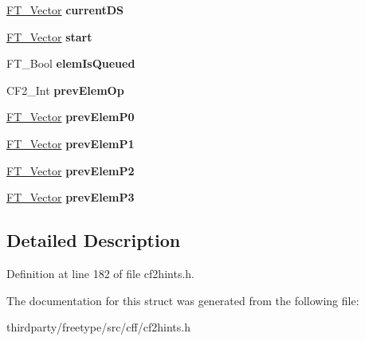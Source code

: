 \begin{DoxyCompactItemize}
\hyperlink{struct_f_t___vector__}{F\+T\+\_\+\+Vector} {\bfseries current\+DS}
\item 
\mbox{\label{struct_c_f2___glyph_path_rec___a9a9f0572cc1f6800b8861e0649f62c09}} 
\hyperlink{struct_f_t___vector__}{F\+T\+\_\+\+Vector} {\bfseries start}
\item 
\mbox{\label{struct_c_f2___glyph_path_rec___ad43b37ad4173fc8131c5863341b4d6c5}} 
F\+T\+\_\+\+Bool {\bfseries elem\+Is\+Queued}
\item 
\mbox{\label{struct_c_f2___glyph_path_rec___a6cd9752b2cee810496777e616506f74c}} 
C\+F2\+\_\+\+Int {\bfseries prev\+Elem\+Op}
\item 
\mbox{\label{struct_c_f2___glyph_path_rec___ad3886cc07890c61ca370da7902fb2c36}} 
\hyperlink{struct_f_t___vector__}{F\+T\+\_\+\+Vector} {\bfseries prev\+Elem\+P0}
\item 
\mbox{\label{struct_c_f2___glyph_path_rec___a020b66000c0d5cec70db4d38911f0b2e}} 
\hyperlink{struct_f_t___vector__}{F\+T\+\_\+\+Vector} {\bfseries prev\+Elem\+P1}
\item 
\mbox{\label{struct_c_f2___glyph_path_rec___a9a6df03953ebe1e8a977b8c17619eadb}} 
\hyperlink{struct_f_t___vector__}{F\+T\+\_\+\+Vector} {\bfseries prev\+Elem\+P2}
\item 
\mbox{\label{struct_c_f2___glyph_path_rec___ae92151111dcc427203aa39df98e82238}} 
\hyperlink{struct_f_t___vector__}{F\+T\+\_\+\+Vector} {\bfseries prev\+Elem\+P3}
\end{DoxyCompactItemize}


\subsection{Detailed Description}


Definition at line 182 of file cf2hints.\+h.



The documentation for this struct was generated from the following file\+:\begin{DoxyCompactItemize}
\item 
thirdparty/freetype/src/cff/cf2hints.\+h\end{DoxyCompactItemize}
